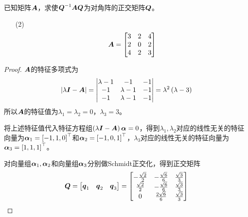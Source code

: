 \begin{problem}
已知矩阵\(\boldsymbol{A}\)，求使\({\boldsymbol{Q}}^{-1}\boldsymbol{A}\boldsymbol{Q}\)为对角阵的正交矩阵\(\boldsymbol{Q}\)。
\begin{enumerate}
    \item[(2)]
        {
        \begin{equation*}
            \boldsymbol{A}=
            \begin{bmatrix}
                3 & 2 & 4 \\
                2 & 0 & 2 \\
                4 & 2 & 3
            \end{bmatrix}
        \end{equation*}
        }
\end{enumerate}
\end{problem}
\begin{proof}
    \(\boldsymbol{A}\)的特征多项式为
    \begin{equation*}
        \left|\lambda\boldsymbol{I}-\boldsymbol{A} \right|=\begin{vmatrix}\lambda-1&-1&-1\\-1&\lambda-1&-1\\-1&\lambda-1&-1\end{vmatrix}=\lambda^2\left( \lambda-3 \right)
    \end{equation*}
    所以\(\boldsymbol{A}\)的特征值为\(\lambda_1=\lambda_2=0\)，\(\lambda_3=3\)。

    将上述特征值代入特征方程组\(\left( \lambda\boldsymbol{I}-\boldsymbol{A} \right)\boldsymbol{\alpha}=0\)，得到\(\lambda_1,\lambda_2\)对应的线性无关的特征向量为\(\boldsymbol{\alpha}_1=\left[ -1,1,0 \right]^\top\)和\(\boldsymbol{\alpha}_2=\left[ -1,0,1 \right]^\top\)，\(\lambda_3\)对应的线性无关的特征向量为\(\boldsymbol{\alpha}_3=\left[ 1,1,1 \right]^\top\)。

    对向量组\(\boldsymbol{\alpha}_1,\boldsymbol{\alpha}_2\)和向量组\(\boldsymbol{\alpha}_3\)分别做Schmidt正交化，得到正交矩阵
    \begin{equation*}
        \boldsymbol{Q}=\begin{bmatrix}\boldsymbol{q}_1&\boldsymbol{q}_2&\boldsymbol{q}_3\end{bmatrix}=
        \begin{bmatrix}
            -\frac{\sqrt{2}}{2} & -\frac{\sqrt{6}}{6} & \frac{\sqrt{3}}{3} \\
            \frac{\sqrt{2}}{2}  & -\frac{\sqrt{6}}{6} & \frac{\sqrt{3}}{3} \\
            0                   & \frac{2\sqrt{6}}{6} & \frac{\sqrt{3}}{3}
        \end{bmatrix}
    \end{equation*}
\end{proof}

